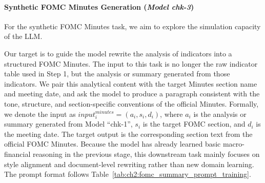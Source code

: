\paragraph*{Synthetic FOMC Minutes Generation (\textit{Model chk-3})}
For the synthetic FOMC Minutes task, we aim to explore the simulation capacity of the LLM. 

Our target is to guide the model rewrite the analysis of indicators into a structured FOMC Minutes. The input to this task is no longer the raw indicator table used in Step 1, but the analysis or summary generated from those indicators. We pair this analytical content with the target Minutes section name and meeting date, and ask the model to produce a paragraph consistent with the tone, structure, and section-specific conventions of the official Minutes. Formally, we denote the input as $input_i^{minutes} = (a_i, s_i, d_i)$, where $a_i$ is the analysis or summary generated from Model ``chk-1'', $s_i$ is the target FOMC section, and $d_i$ is the meeting date. The target output is the corresponding section text from the official FOMC Minutes. Because the model has already learned basic macro-financial reasoning in the previous stage, this downstream task mainly focuses on style alignment and document-level rewriting rather than new domain learning. The prompt format follows Table~\ref{tab:ch2:fomc_summary_prompt_training}.

